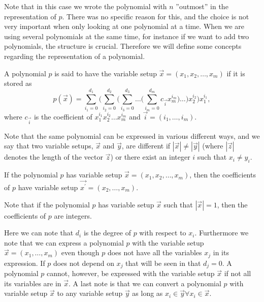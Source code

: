 Note that in this case we wrote the polynomial with $n$ ''outmost'' in the representation of $p$. There was no specific reason for this, and the choice is not very important when only looking at one polynomial at a time. When we are using several polynomials at the same time, for instance if we want to add two polynomials, the structure is crucial. Therefore we will define some concepts regarding the representation of a polynomial.

\begin{definition}
  A polynomial $p$ is said to have the variable setup $\vec{x}=(x_1,x_2,\ldots,x_m)$ if it is stored as
  \begin{equation}
    p(\vec{x}) = \sum_{i_1=0}^{d_1}\Bigg(\sum_{i_2=0}^{d_2}\Big(\sum_{i_3=0}^{d_3}\ldots\big(\sum_{i_m=0}^{d_m} c_\vec{i}x_m^{i_m}\big)\ldots\Big)x_2^{i_2}\Bigg)x_1^{i_1},
  \end{equation}
  where $c_\vec{i}$ is the coefficient of $x_1^{i_1}x_2^{i_2}\ldots x_m^{i_m}$ and $\vec{i}=(i_1,\ldots,i_m)$.

  Note that the same polynomial can be expressed in various different ways, and we say that two variable setups, $\vec{x}$ and $\vec{y}$, are different if $|\vec{x}|\neq|\vec{y}|$ (where $|\vec{z}|$ denotes the length of the vector $\vec{z}$) or there exist an integer $i$ such that $x_i\neq y_i$.
\end{definition}
\begin{remark}
  If the polynomial $p$ has variable setup $\vec{x}=(x_1,x_2,\ldots,x_m)$, then the coefficients of $p$ have variable setup $\vec{x^\prime}=(x_2,\ldots,x_m)$.
\end{remark}
\begin{remark}
  Note that if the polynomial $p$ has variable setup $\vec{x}$ such that $|\vec{x}|=1$, then the coefficients of $p$ are integers.
\end{remark}

Here we can note that $d_i$ is the degree of $p$ with respect to $x_i$. Furthermore we note that we can express a polynomial $p$ with the variable setup $\vec{x}=(x_1,\ldots,x_m)$ even though $p$ does not have all the variables $x_j$ in its expression. If $p$ does not depend on $x_j$ that will be seen in that $d_j=0$. A polynomial $p$ cannot, however, be expressed with the variable setup $\vec{x}$ if not all its variables are in $\vec{x}$. A last note is that we can convert a polynomial $p$ with variable setup $\vec{x}$ to any variable setup $\vec{y}$ as long as $x_i\in\vec{y} \forall x_i\in\vec{x}$.

